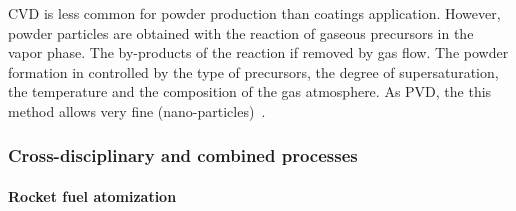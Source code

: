 \documentclass[../main]{subfiles}
\begin{document}
CVD is less common for powder production than coatings application. However, powder particles are obtained with the reaction of gaseous precursors in the vapor phase. The by-products of the reaction if removed by gas flow. The powder formation in controlled by the type of precursors, the degree of supersaturation, the temperature and the composition of the gas atmosphere. As PVD, the this method allows very fine (nano-particles)~\cite{Neikov2009HandbookNonFerrous}.


\subsubsection{Cross-disciplinary and combined processes}

\paragraph{Rocket fuel atomization}
\end{document}
